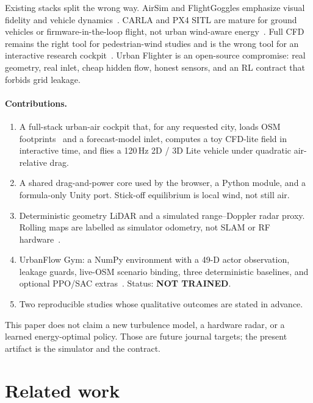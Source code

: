 \documentclass[11pt]{article}
\begin{document}
Existing stacks split the wrong way.
AirSim and FlightGoggles emphasize visual fidelity and vehicle dynamics~\cite{shah2018airsim,guerra2019flightgoggles}.
CARLA and PX4 SITL are mature for ground vehicles or firmware-in-the-loop flight, not urban wind-aware energy~\cite{dosovitskiy2017carla,meier2015px4}.
Full CFD remains the right tool for pedestrian-wind studies and is the wrong tool for an interactive research cockpit~\cite{blocken2014cfd,tominaga2008aij}.
Urban Flighter is an open-source compromise: real geometry, real inlet, cheap hidden flow, honest sensors, and an RL contract that forbids grid leakage.

\paragraph{Contributions.}
\begin{enumerate}
  \item A full-stack urban-air cockpit that, for any requested city, loads OSM footprints~\cite{haklay2008osm,boeing2017osmnx} and a forecast-model inlet, computes a toy CFD-lite field in interactive time, and flies a 120\,Hz 2D / 3D Lite vehicle under quadratic air-relative drag.
  \item A shared drag-and-power core used by the browser, a Python module, and a formula-only Unity port. Stick-off equilibrium is local wind, not still air.
  \item Deterministic geometry LiDAR and a simulated range--Doppler radar proxy. Rolling maps are labelled as simulator odometry, not SLAM or RF hardware~\cite{patole2017fmcw}.
  \item UrbanFlow Gym: a NumPy environment with a 49-D actor observation, leakage guards, live-OSM scenario binding, three deterministic baselines, and optional PPO/SAC extras~\cite{towers2024gymnasium,schulman2017ppo,haarnoja2018sac,raffin2021sb3}. Status: \textbf{NOT TRAINED}.
  \item Two reproducible studies whose qualitative outcomes are stated in advance.
\end{enumerate}

This paper does not claim a new turbulence model, a hardware radar, or a learned energy-optimal policy.
Those are future journal targets; the present artifact is the simulator and the contract.

\section{Related work}
\end{document}
